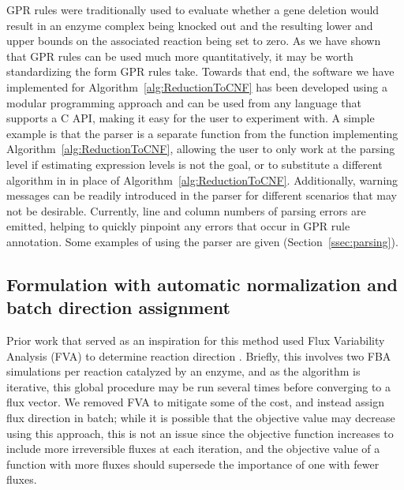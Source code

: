 %
%

GPR rules were traditionally used to evaluate whether a gene deletion
would result in an enzyme complex being knocked out and the resulting
lower and upper bounds on the associated reaction being set to
zero. As we have shown that GPR rules can be used much more
quantitatively, it may be worth standardizing the form GPR rules
take. Towards that end, the software we have implemented for
Algorithm~\ref{alg:ReductionToCNF} has been developed using a modular
programming approach and can be used from any language that supports
a C API, making it easy for the user to experiment
with. A simple example is that the parser is a separate function from
the function implementing Algorithm~\ref{alg:ReductionToCNF}, allowing
the user to only work at the parsing level if estimating expression
levels is not the goal, or to substitute a different algorithm in in
place of Algorithm~\ref{alg:ReductionToCNF}. Additionally, warning
messages can be readily introduced in the parser for different
scenarios that may not be desirable. Currently, line and column
numbers of parsing errors are emitted, helping to quickly pinpoint any
errors that occur in GPR rule annotation. Some examples of using
the parser are given (\suppOrApp Section~\ref{ssec:parsing}).

\subsection{Formulation with automatic normalization and batch direction assignment}

Prior work that served as an inspiration for this method used Flux
Variability Analysis (FVA) to determine reaction direction
\citep{Lee2012}. Briefly, this involves two FBA simulations per
reaction catalyzed by an enzyme, and as the algorithm is iterative,
this global procedure may be run several times before converging to a
flux vector. We removed FVA to mitigate some
of the cost, and instead assign flux direction in batch; while it is
possible that the objective value may decrease using this approach,
this is not an issue since the objective function increases to include
more irreversible fluxes at each iteration, and the objective value of
a function with more fluxes should supersede the importance of one
with fewer fluxes.
 
